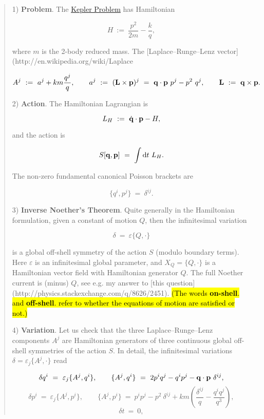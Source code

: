 \documentclass{article}
\numberwithin{equation}{subsection} %
\theoremstyle{definition}
\begin{document}
    \begin{quote}
        1) \textbf{Problem}. The \href{http://en.wikipedia.org/wiki/Kepler_problem}{Kepler Problem} has Hamiltonian

        $$ H~:=~ \frac{p^2}{2m}- \frac{k}{q},  $$

        where $m$ is the 2-body reduced mass. The [Laplace–Runge–Lenz vector](http://en.wikipedia.org/wiki/Laplace%

        $$ A^j ~:=~a^j  + km\frac{q^j}{q}, \qquad a^j~:=~({\bf L} \times {\bf p})^j~=~{\bf q}\cdot{\bf p}~p^j- p^2~q^j,\qquad {\bf L}~:=~ {\bf q} \times {\bf p}.$$ 

        2) \textbf{Action}. The Hamiltonian Lagrangian is

        $$  L_H~:=~ \dot{\bf q}\cdot{\bf p} - H, $$

        and the action is 

        $$ S[{\bf q},{\bf p}]~=~ \int {\rm d}t~L_H .$$

        The non-zero fundamental canonical Poisson brackets are 

        $$ \{ q^i , p^j\}~=~ \delta^{ij}. $$

        3) \textbf{Inverse Noether's Theorem}. Quite generally in the Hamiltonian formulation, given a constant of motion $Q$, then the infinitesimal variation 

        $$\delta~=~ \varepsilon \{Q,\cdot\}$$ 

        is a global off-shell symmetry of the action $S$ (modulo boundary terms). Here $\varepsilon$ is an infinitesimal global parameter, and $X_Q=\{Q,\cdot\}$ is a Hamiltonian vector field with Hamiltonian generator $Q$. The full Noether current is (minus) $Q$, see e.g. my answer to [this question](http://physics.stackexchange.com/q/8626/2451). \hl{(The words \textbf{on-shell}. and \textbf{off-shell}. refer to whether the equations of motion are satisfied or not.)}

        4) \textbf{Variation}. Let us check that the three Laplace–Runge–Lenz components $A^j$ are Hamiltonian generators of three continuous global off-shell symmetries of the action $S$. In detail, the infinitesimal variations $\delta= \varepsilon_j \{A^j,\cdot\}$ read

        $$ \delta  q^i ~=~  \varepsilon_j  \{A^j,q^i\}   , \qquad 
         \{A^j,q^i\} ~ =~ 2 p^i q^j - q^i p^j - {\bf q}\cdot{\bf p}~\delta^{ij}, $$
        $$ \delta  p^i ~=~  \varepsilon_j  \{A^j,p^i\}   , \qquad  
        \{A^j,p^i\}~ =~ p^i p^j - p^2~\delta^{ij} +km\left(\frac{\delta^{ij}}{q}- \frac{q^i q^j}{q^3}\right), $$
        $$ \delta  t ~=~0,$$


\end{quote}
\end{document}

